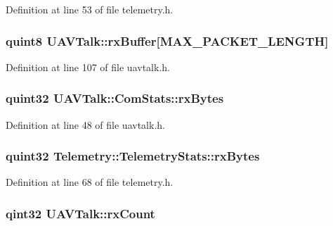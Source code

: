 \-Definition at line 53 of file telemetry.\-h.

\hypertarget{group___u_a_v_talk_plugin_ga612e1b395a61ee81d90d8199ba789a86}{
\subsubsection[{rx\-Buffer}]{\setlength{\rightskip}{0pt plus 5cm}quint8 {\bf \-U\-A\-V\-Talk\-::rx\-Buffer}\mbox{[}\-M\-A\-X\-\_\-\-P\-A\-C\-K\-E\-T\-\_\-\-L\-E\-N\-G\-T\-H\mbox{]}}}\label{group___u_a_v_talk_plugin_ga612e1b395a61ee81d90d8199ba789a86}


\-Definition at line 107 of file uavtalk.\-h.

\hypertarget{group___u_a_v_talk_plugin_ga93a6f8b7f60333a7e7afb70085ca7efd}{
\subsubsection[{rx\-Bytes}]{\setlength{\rightskip}{0pt plus 5cm}quint32 {\bf \-U\-A\-V\-Talk\-::\-Com\-Stats\-::rx\-Bytes}}}\label{group___u_a_v_talk_plugin_ga93a6f8b7f60333a7e7afb70085ca7efd}


\-Definition at line 48 of file uavtalk.\-h.

\hypertarget{group___u_a_v_talk_plugin_gadda927fbb6858f5e60b6daf16d5bc94e}{
\subsubsection[{rx\-Bytes}]{\setlength{\rightskip}{0pt plus 5cm}quint32 {\bf \-Telemetry\-::\-Telemetry\-Stats\-::rx\-Bytes}}}\label{group___u_a_v_talk_plugin_gadda927fbb6858f5e60b6daf16d5bc94e}


\-Definition at line 68 of file telemetry.\-h.

\hypertarget{group___u_a_v_talk_plugin_ga380dea6ca845f80612070ed17ea65655}{
\subsubsection[{rx\-Count}]{\setlength{\rightskip}{0pt plus 5cm}qint32 {\bf \-U\-A\-V\-Talk\-::rx\-Count}}}\label{group___u_a_v_talk_plugin_ga380dea6ca845f80612070ed17ea65655}


